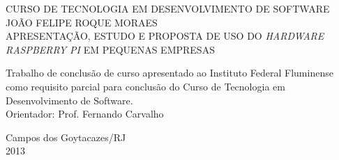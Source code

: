 \begin{titlepage}
 \begin{figure}[ht]
 \centering
 \end{figure}
 \begin{center}
   {\large CURSO DE TECNOLOGIA EM DESENVOLVIMENTO DE SOFTWARE} \\ [3.5cm]
   {\large JOÃO FELIPE ROQUE MORAES} \\ [4cm]
   {\large APRESENTAÇÃO, ESTUDO E PROPOSTA DE USO DO \textit{HARDWARE RASPBERRY PI} EM PEQUENAS EMPRESAS } \\ [2cm]
   \hspace{.45\textwidth} %
   \begin{minipage}{0.5\textwidth}
   \begin{espacosimples}
        Trabalho de conclusão de curso apresentado ao Instituto Federal Fluminense como requisito parcial para conclusão do Curso de Tecnologia em Desenvolvimento de Software.\\[1.5cm]
        Orientador: Prof. Fernando Carvalho
    \end{espacosimples}
    \end{minipage}
   \vfill
   {\large Campos dos Goytacazes/RJ} \\
   {\large 2013}
 \end{center}
\end{titlepage}
